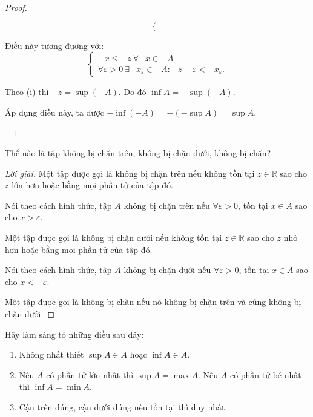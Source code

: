 \documentclass[class=analysis,crop=false]{standalone}
\begin{document}
\begin{proof}
\begin{enumerate}[label = (\roman*)]
\[\begin{cases}
                 \end{cases}
             \]
             \par Điều này tương đương với:
             \[
                 \begin{cases}
                     -x\le -z\ \forall -x\in -A \\
                     \forall\varepsilon > 0\ \exists -x_{\varepsilon}\in -A : -z - \varepsilon < -x_{\varepsilon}.
                 \end{cases}
             \]
             \par Theo (i) thì $-z = \sup(-A)$. Do đó $\inf A = -\sup(-A)$.
             \par Áp dụng điều này, ta được $-\inf(-A) = -(-\sup A) = \sup A$.
    \end{enumerate}
\end{proof}

\begin{exercise}
    Thế nào là tập không bị chặn trên, không bị chặn dưới, không bị chặn?
\end{exercise}

\begin{proof}[Lời giải]
    Một tập được gọi là không bị chặn trên nếu không tồn tại $z\in\mathbb{R}$ sao cho $z$ lớn hơn hoặc bằng mọi phần tử của tập đó.
    \par Nói theo cách hình thức, tập $A$ không bị chặn trên nếu $\forall\varepsilon > 0$, tồn tại $x\in A$ sao cho $x > \varepsilon$.
    \bigskip
    \par Một tập được gọi là không bị chặn dưới nếu không tồn tại $z\in\mathbb{R}$ sao cho $z$ nhỏ hơn hoặc bằng mọi phần tử của tập đó.
    \par Nói theo cách hình thức, tập $A$ không bị chặn dưới nếu $\forall\varepsilon > 0$, tồn tại $x\in A$ sao cho $x < -\varepsilon$.
    \bigskip
    \par Một tập được gọi là không bị chặn nếu nó không bị chặn trên và cũng không bị chặn dưới.
\end{proof}

\begin{exercise}
    Hãy làm sáng tỏ những điều sau đây:
    \begin{enumerate}[label = (\roman*)]
        \item Không nhất thiết $\sup A\in A$ hoặc $\inf A\in A$.
        \item Nếu $A$ có phần tử lớn nhất thì $\sup A = \max A$. Nếu $A$ có phần tử bé nhất thì $\inf A = \min A$.
        \item Cận trên đúng, cận dưới đúng nếu tồn tại thì duy nhất.
    \end{enumerate}
\end{exercise}
\end{document}
